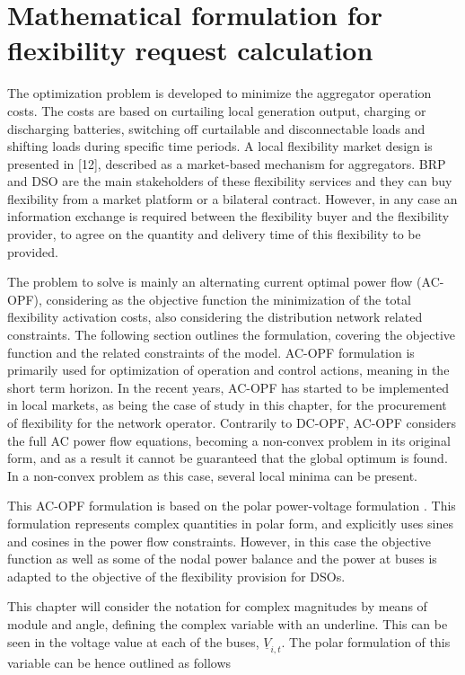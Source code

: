 \section{Mathematical formulation for flexibility request calculation}
The optimization problem is developed to minimize the aggregator operation costs. The costs are based on curtailing local generation output, charging or discharging batteries, switching off curtailable and disconnectable loads and shifting loads during specific time periods. A local flexibility market design is presented in [12], described as a market-based mechanism for aggregators. BRP and DSO are the main stakeholders of these flexibility services and they can buy flexibility from a market platform or a bilateral contract. However, in any case an information exchange is required between the flexibility buyer and the flexibility provider, to agree on the quantity and delivery time of this flexibility to be provided. 


The problem to solve is mainly an alternating current optimal power flow (AC-OPF), considering as the objective function the minimization of the total flexibility activation costs, also considering the distribution network related constraints. The following section outlines the formulation, covering the objective function and the related constraints of the model. AC-OPF formulation is primarily used for optimization of operation and control actions, meaning in the short term horizon. In the recent years, AC-OPF has started to be implemented in local markets, as being the case of study in this chapter, for the procurement of flexibility for the network operator. Contrarily to DC-OPF, AC-OPF considers the full AC power flow equations, becoming a non-convex problem in its original form, and as a result it cannot be guaranteed that the global optimum is found. In a non-convex problem as this case, several local minima can be present. 

This AC-OPF formulation is based on the polar power-voltage formulation \cite{OPF_Formulation}. This formulation represents complex quantities in polar form, and explicitly uses sines and cosines in the power flow constraints. However, in this case the objective function as well as some of the nodal power balance and the power at buses is adapted to the objective of the flexibility provision for DSOs.

This chapter will consider the notation for complex magnitudes by means of module and angle, defining the complex variable with an underline. This can be seen in the voltage value at each of the buses, $\underline{V}_{i,t}$. The polar formulation of this variable can be hence outlined as follows

